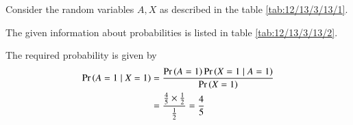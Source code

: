 		Consider the random variables $A,X$ as described in the table \ref{tab:12/13/3/13/1}.
\begin{table}[H]
\centering

\caption{}
\label{tab:12/13/3/13/1}
\end{table}
%
The given information about probabilities is listed in table \ref{tab:12/13/3/13/2}.
\begin{table}[H]
\centering

\caption{}
\label{tab:12/13/3/13/2}
\end{table}
The required probability is given by
\begin{align}
\Pr\left(A = 1 \mid X = 1\right) &= \frac{\Pr\left(A = 1\right) \Pr\left(X = 1 \mid A = 1\right)}{\Pr\left(X = 1\right)}\\
&= \frac{\frac{4}{5} \times \frac{1}{2}}{\frac{1}{2}}
= \frac{4}{5}
\end{align}


